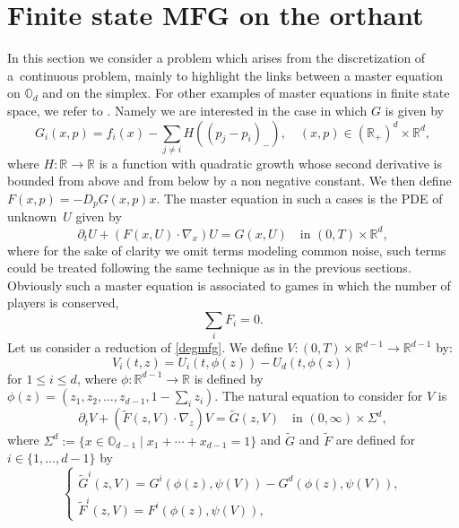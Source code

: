 \documentclass[10pt]{amsart}
\let\sep\mid
\theoremstyle{definition}
\begin{document}
\section{Finite state MFG on the orthant}\label{app:B}
In this section we consider a problem which arises from the discretization of a~continuous problem, mainly to highlight the links between a master equation on $\mathbb{O}_d$ and on the simplex. For other examples of master equations in finite state space, we refer to \cite{bayraktar2019finite,bertucci2020mean}. Namely we are interested in the case in which $G$ is given by
\begin{equation}\label{discrete}
G_i(x,p) = f_i(x)-\sum_{j \ne i}H((p_{j}- p_i)_-),\quad (x,p) \in (\mathbb{R}_+)^d \times \mathbb{R}^d,
\end{equation}
where $H: \mathbb{R} \to \mathbb{R}$ is a function with quadratic growth whose second derivative is bounded from above and from below by a non negative constant. We then define $F(x,p) =- D_pG(x,p)x$. The master equation in such a cases is the PDE of unknown~$U$ given by
\begin{equation}\label{degmfg}
\partial_t U+(F(x,U)\cdot \nabla_x)U = G(x, U) \quad\text{in } (0,T)\times \mathbb{R}^d,
\end{equation}
where for the sake of clarity we omit terms modeling common noise, such terms could be treated following the same technique as in the previous sections. Obviously such a master equation is associated to games in which the number of players is conserved,~\ie
\begin{equation*}
\sum_{i}F_i = 0.
\end{equation*}
Let us consider a reduction of \eqref{degmfg}. We define $V:(0,T)\times \mathbb{R}^{d-1} \to \mathbb{R}^{d-1}$ by:
\begin{equation}\label{defV2}
V_i(t,z) = U_i(t,\phi(z))-U_d(t,\phi(z))
\end{equation}
for $1\leq i \leq d$, where $\phi: \mathbb{R}^{d-1}\to \mathbb{R}$ is defined by $\phi(z) = (z_1,z_2,\dots,z_{d-1},1-\sum_i z_i)$. The natural equation to consider for $V$ is
\begin{equation}\label{changmfg}
\partial_t V+(\tilde{F}(z,V)\cdot\nabla_z)V = \tilde{G}(z,V) \quad\text{in } (0, \infty) \times \Sigma^d,
\end{equation}
where $\Sigma^d:= \{ x \in \mathbb{O}_{d-1} \sep x_1+\cdots+ x_{d-1}= 1\}$ and $\tilde{G}$ and $\tilde{F}$ are defined for $i \in \{1,\dots,d-1\}$ by
\begin{equation*}
\begin{cases}
\tilde{G}^i(z,V) = G^i(\phi(z),\psi(V))- G^d(\phi(z),\psi(V)),\\
\tilde{F}^i(z,V) = F^i(\phi(z),\psi(V)),
\end{cases}
\end{equation*}
\end{document}
